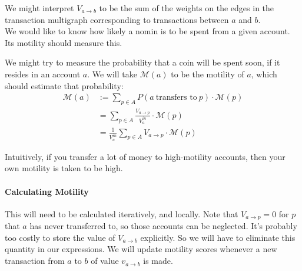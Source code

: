 \documentclass{article}
\begin{document}
We might interpret \(V_{a \rightarrow b}\) to be the sum of the weights on the edges in
the transaction multigraph corresponding to transactions between \(a\) and \(b\). \\

We would like to know how likely a nomin is to be spent from a given account. Its motility should measure this.

We might try to measure the probability that a coin will be spent soon, if it resides in an account \(a\).
We will take \(\mathcal{M}(a)\) to be the motility of \(a\), which should estimate that probability:
\begin{align*}
    \mathcal{M}(a) &:= \sum_{p \in A}{P(a \ \text{transfers to} \ p) \cdot \mathcal{M}(p)} \\
    &= \sum_{p \in A}{\frac{V_{a \rightarrow p}}{V_{a}^{in}} \cdot \mathcal{M}(p)} \\
    &= \frac{1}{V_{a}^{in}} \sum_{p \in A}{V_{a \rightarrow p} \cdot \mathcal{M}(p)}
\end{align*}

Intuitively, if you transfer a lot of money to high-motility accounts, then your own motility is
taken to be high.

\paragraph{Calculating Motility}
This will need to be calculated iteratively, and locally.
Note that \(V_{a \rightarrow p} = 0\) for \(p\) that \(a\) has never transferred to,
so those accounts can be neglected.
It's probably too costly to store the value of \(V_{a \rightarrow b}\) explicitly. So we will have
to eliminate this quantity in our expressions.
We will update motility scores whenever a new transaction from \(a\) to \(b\) of value \(v_{a \rightarrow b}\) is made.
\end{document}
